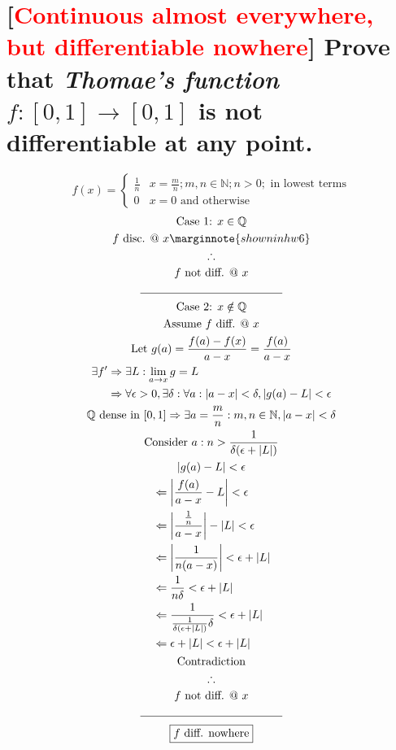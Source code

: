 \documentclass[letterpaper]{article}
\DeclarePairedDelimiter\abs{\lvert}{\rvert}
\begin{document}
\pagebreak

\section{[\textcolor{red}{Continuous almost everywhere, but differentiable nowhere}] Prove that \textit{Thomae's function} $f:[0,1]\rightarrow[0,1]$ is not differentiable at any point.}
\begin{displaymath}
	f(x) = \left\{
		\begin{array}{ll}
			\frac{1}{n} & x=\frac{m}{n}; m,n\in\mathbb{N};n>0;\text{ in lowest terms} \\
			0 & x=0 \text{ and otherwise}
		\end{array}
	\right.
\end{displaymath}
\begin{gather*}
	\text{Case 1: } x\in\mathbb{Q} \\
	f \text{ disc. @ } x \marginnote{shown in hw6} \\
	\therefore \\
	f \text{ not diff. @ } x \\
	\line(1, 0){125} \\
	\text{Case 2: } x\notin\mathbb{Q} \\
	\text{Assume }f\text{ diff. @ }x \\
	\text{Let }g(a)=\frac{f(a)-f(x)}{a-x}=\frac{f(a)}{a-x} \\
	\begin{aligned}
		\exists f'&\Rightarrow\exists L:\lim_{a\rightarrow x}g=L \\
		&\Rightarrow \forall\epsilon>0, \exists\delta:\forall a:|a-x|<\delta,|g(a)-L|<\epsilon \\
	\end{aligned} \\
	\mathbb{Q}\text{ dense in }[0,1]\Rightarrow\exists a=\frac{m}{n}:m,n\in\mathbb{N},|a-x|<\delta \\
	\text{Consider }a:n>\frac{1}{\delta(\epsilon+|L|)} \\
	|g(a)-L|<\epsilon \\
	\begin{aligned}
		&\Leftarrow\abs[\bigg]{\frac{f(a)}{a-x}-L}<\epsilon \\
		&\Leftarrow\abs[\bigg]{\frac{\frac{1}{n}}{a-x}}-\abs{L}<\epsilon \\
		&\Leftarrow\abs[\bigg]{\frac{1}{n(a-x)}}<\epsilon+\abs{L} \\
		&\Leftarrow\frac{1}{n\delta}<\epsilon+\abs{L} \\
		&\Leftarrow\frac{1}{\frac{1}{\delta(\epsilon+|L|)}\delta}<\epsilon+\abs{L} \\
		&\Leftarrow\epsilon+\abs{L}<\epsilon+\abs{L} \\
	\end{aligned} \\
	\text{Contradiction} \\
	\therefore \\
	f\text{ not diff. @ }x \\
	\line(1, 0){125} \\
	\boxed{f\text{ diff. nowhere}}
\end{gather*}
\end{document}
